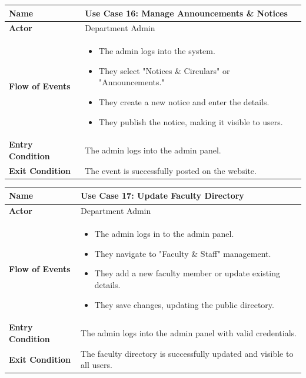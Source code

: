 \documentclass[11pt]{article}
\begin{document}
\begin{center}
\begin{tabular}{ | >{\bfseries}m{6em} | m{10cm} | }
  \hline
  \textbf{Name} & Use Case 16: Manage Announcements \& Notices \\
  \hline
  \textbf{Actor} & Department Admin \\
  \hline
  \textbf{Flow of Events} & 
  \begin{itemize}
      \item The admin logs into the system.
      \item They select "Notices \& Circulars" or "Announcements."
      \item They create a new notice and enter the details.
      \item They publish the notice, making it visible to users.
  \end{itemize} \\
  \hline
  \textbf{Entry Condition} & The admin logs into the admin panel. \\
  \hline
  \textbf{Exit Condition} & The event is successfully posted on the website. \\
  \hline
\end{tabular}
\end{center}

\begin{center}
\begin{tabular}{ | >{\bfseries}m{6em} | m{10cm} | }
  \hline
  \textbf{Name} & Use Case 17: Update Faculty Directory \\
  \hline
  \textbf{Actor} & Department Admin \\
  \hline
  \textbf{Flow of Events} & 
  \begin{itemize}
      \item The admin logs in to the admin panel.
      \item They navigate to "Faculty \& Staff" management.
      \item They add a new faculty member or update existing details.
      \item They save changes, updating the public directory.
  \end{itemize} \\
  \hline
  \textbf{Entry Condition} & The admin logs into the admin panel with valid credentials. \\
  \hline
  \textbf{Exit Condition} & The faculty directory is successfully updated and visible to all users. \\
  \hline
\end{tabular}
\end{center}
\end{document}
